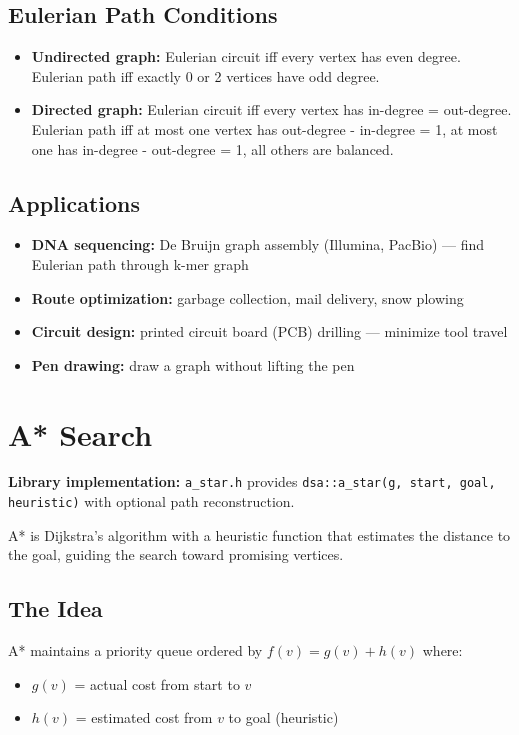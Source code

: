 \subsection{Eulerian Path Conditions}

\begin{itemize}
\item \textbf{Undirected graph:} Eulerian circuit iff every vertex has even degree. Eulerian path iff exactly 0 or 2 vertices have odd degree.
\item \textbf{Directed graph:} Eulerian circuit iff every vertex has in-degree = out-degree. Eulerian path iff at most one vertex has out-degree - in-degree = 1, at most one has in-degree - out-degree = 1, all others are balanced.
\end{itemize}

\subsection{Applications}

\begin{itemize}
\item \textbf{DNA sequencing:} De Bruijn graph assembly (Illumina, PacBio) — find Eulerian path through k-mer graph
\item \textbf{Route optimization:} garbage collection, mail delivery, snow plowing
\item \textbf{Circuit design:} printed circuit board (PCB) drilling — minimize tool travel
\item \textbf{Pen drawing:} draw a graph without lifting the pen
\end{itemize}

\section{A* Search}

\textbf{Library implementation:} \texttt{a\_star.h} provides \texttt{dsa::a\_star(g, start, goal, heuristic)} with optional path reconstruction.

A* is Dijkstra's algorithm with a heuristic function that estimates the distance to the goal, guiding the search toward promising vertices.

\subsection{The Idea}

A* maintains a priority queue ordered by $f(v) = g(v) + h(v)$ where:
\begin{itemize}
\item $g(v)$ = actual cost from start to $v$
\item $h(v)$ = estimated cost from $v$ to goal (heuristic)
\end{itemize}

